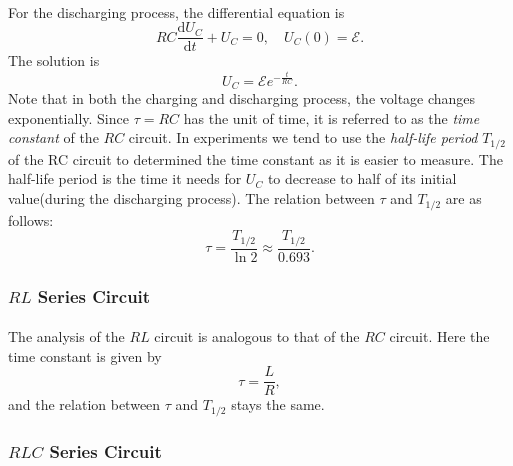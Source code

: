 \documentclass{my_template}
\newcommand{\e}{\mathcal{E}}
\begin{document}
    \paragraph{} For the discharging process, the differential equation is 
    \begin{equation}
        RC\frac{\mathrm{d}U_C}{\mathrm{d}t}+U_C=0,\quad U_C(0)=\e.\label{eqn:RCdischarging}
    \end{equation}
    The solution is $$U_C=\e e^{-\frac{t}{RC}}.$$
    Note that in both the charging and discharging process, the voltage changes exponentially. Since $\tau=RC$ has the unit of time, it is referred to as the \emph{time constant} of the $RC$ circuit. In experiments we tend to use the \emph{half-life period} $T_{1/2}$ of the RC circuit to determined the time constant as it is easier to measure. The half-life period is the time it needs for $U_C$ to decrease to half of its initial value(during the discharging process). The relation between $\tau$ and $T_{1/2}$ are as follows: $$\tau=\frac{T_{1/2}}{\ln 2}\approx\frac{T_{1/2}}{0.693}.$$
    \subsubsection{$RL$ Series Circuit} 
    \paragraph{} The analysis of the $RL$ circuit is analogous to that of the $RC$ circuit. Here the time constant is given by $$\tau=\frac{L}{R},$$ and the relation between $\tau$ and $T_{1/2}$ stays the same.
    \subsubsection{$RLC$ Series Circuit}
\end{document}
